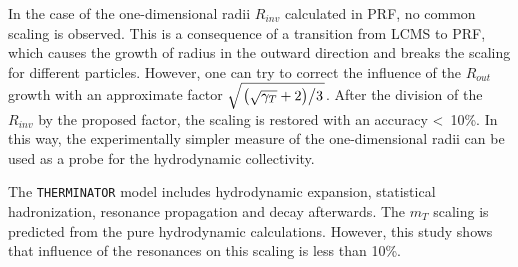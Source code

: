   In the case of the one-dimensional radii $R_{inv}$ calculated in PRF, no common scaling is observed.
  This is a consequence of a transition from LCMS to PRF, which causes the growth of radius in the outward direction and breaks the scaling for different particles.
  However, one can try to correct the influence of the $R_{out}$ growth with an approximate factor $\sqrt{ \left. \left( \sqrt{\gamma_T} + 2 \right) \middle/ 3 \right. }$.
  After the division of the $R_{inv}$ by the proposed factor, the scaling is restored with an accuracy <~10\%.
  In this way, the experimentally simpler measure of the one-dimensional radii can be used as a probe for the hydrodynamic collectivity.

  The \verb|THERMINATOR| model includes hydrodynamic expansion, statistical hadronization, resonance propagation and decay afterwards.
  The $m_T$ scaling is predicted from the pure hydrodynamic calculations.
  However, this study shows that influence of the resonances on this scaling is less than 10\%.